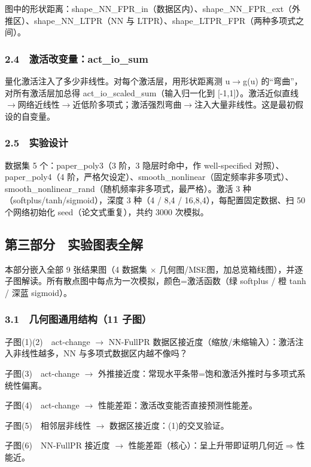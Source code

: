 \documentclass[UTF8,a4paper,11pt]{ctexart}
\begin{document}
图中的形状距离：shape\_NN\_FPR\_in（数据区内）、shape\_NN\_FPR\_ext（外推区）、shape\_NN\_LTPR（NN 与 LTPR）、shape\_LTPR\_FPR（两种多项式之间）。

\subsubsection{2.4　激活改变量：act\_io\_sum}

量化激活注入了多少非线性。对每个激活层，用形状距离测 u$\to$g(u) 的“弯曲”，对所有激活层加总得 act\_io\_scaled\_sum（输入归一化到 [-1,1]）。激活近似直线$\to$网络近线性$\to$近低阶多项式；激活强烈弯曲$\to$注入大量非线性。这是最初假设的自变量。

\subsubsection{2.5　实验设计}

数据集 5 个：paper\_poly3（3 阶，3 隐层时命中，作 well-specified 对照）、paper\_poly4（4 阶，严格欠设定）、smooth\_nonlinear（固定频率非多项式）、smooth\_nonlinear\_rand（随机频率非多项式，最严格）。激活 3 种（softplus/tanh/sigmoid），深度 3 种（4 / 8,4 / 16,8,4），每配置固定数据、扫 50 个网络初始化 seed（论文式重复），共约 3000 次模拟。

\subsection{第三部分　实验图表全解}

本部分嵌入全部 9 张结果图（4 数据集 $\times$ 几何图/MSE图，加总览箱线图），并逐子图解读。所有散点图中每点为一次模拟，颜色=激活函数（绿 softplus / 橙 tanh / 深蓝 sigmoid）。

\subsubsection{3.1　几何图通用结构（11 子图）}

子图(1)(2)　act-change $\to$ NN-FullPR 数据区接近度（缩放/未缩输入）：激活注入非线性越多，NN 与多项式数据区内越不像吗？

子图(3)　act-change $\to$ 外推接近度：常现水平条带=饱和激活外推时与多项式系统性偏离。

子图(4)　act-change $\to$ 性能差距：激活改变能否直接预测性能差。

子图(5)　相邻层非线性 $\to$ 数据区接近度：(1)的交叉验证。

子图(6)　NN-FullPR 接近度 $\to$ 性能差距（核心）：呈上升带即证明几何近$\Rightarrow$性能近。
\end{document}
